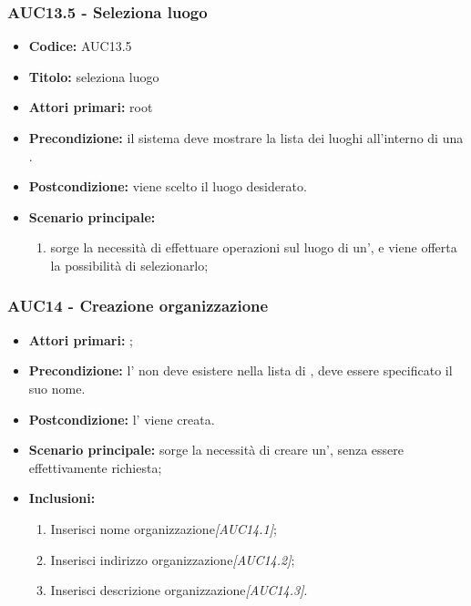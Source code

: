 \documentclass[casi-duso]{subfiles}
\begin{document}
\subsubsection{AUC13.5 - Seleziona luogo}
\label{subsub:AUC13.5}
\begin{itemize}
  \item \textbf{Codice:} AUC13.5
  \item \textbf{Titolo:} seleziona luogo
  \item \textbf{Attori primari:} root
  \item \textbf{Precondizione:} il sistema deve mostrare la lista dei luoghi all'interno di una .
  \item \textbf{Postcondizione:} viene scelto il luogo desiderato.
  \item \textbf{Scenario principale:}
  \begin{enumerate}
    \item sorge la necessità di effettuare operazioni sul luogo di un', e viene offerta la possibilità di selezionarlo;
  \end{enumerate}
\end{itemize}

\subsubsection{AUC14 - Creazione organizzazione}
\label{subsub:AUC14}
\begin{itemize}
  \item \textbf{Attori primari:} ;
  \item \textbf{Precondizione:} l' non deve esistere nella lista di , deve essere specificato il suo nome.
  \item \textbf{Postcondizione:} l' viene creata.
  \item \textbf{Scenario principale:} sorge la necessità di creare un', senza essere effettivamente richiesta;
  \item \textbf{Inclusioni:}
  \begin{enumerate}
    \item Inserisci nome organizzazione\emph{[AUC14.1]};
    \item Inserisci indirizzo organizzazione\emph{[AUC14.2]};
    \item Inserisci descrizione organizzazione\emph{[AUC14.3]}.
  \end{enumerate}
\end{itemize}
\end{document}
